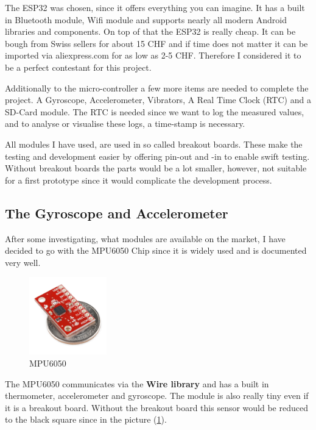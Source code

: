 The ESP32 was chosen, since it offers everything you can imagine. It has a built in Bluetooth module, Wifi module and supports nearly all modern Android libraries and components. On top of that the ESP32 is really cheap. It can be bough from Swiss sellers for about 15 CHF and if time does not matter it can be imported via aliexpress.com for as low as 2-5 CHF. Therefore I considered it to be a perfect contestant for this project. 

Additionally to the micro-controller a few more items are needed to complete the project. A Gyroscope, Accelerometer, Vibrators, A Real Time Clock (RTC) and a SD-Card module. The RTC is needed since we want to log the measured values, and to analyse or visualise these logs, a time-stamp is necessary. 

All modules I have used, are used in so called breakout boards. These make the testing and development easier by offering pin-out and -in to enable swift testing. Without breakout boards the parts would be a lot smaller, however, not suitable for a first prototype since it would complicate the development process.

\subsection{The Gyroscope and Accelerometer}

After some investigating, what modules are available on the market, I have decided to go with the 
MPU6050 Chip since it is widely used and is documented very well. 

\begin{figure}
  \begin{center}
\includegraphics[width=0.3\textwidth]{images/MPU_6050.jpg}
  \end{center}
  \caption{MPU6050}
  \label{fig:MPU6050}
\end{figure}

The MPU6050 communicates via the \textbf{Wire library} and has a built in thermometer, accelerometer and gyroscope. The module is also really tiny even if it is a breakout board.
Without the breakout board this sensor would be reduced to the black square since in the picture  (\ref{fig:MPU6050}).

